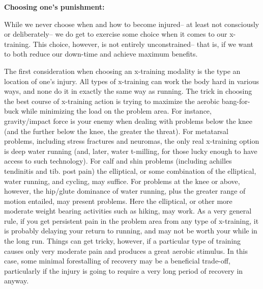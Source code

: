 \bigskip

\textbf{Choosing one's punishment:}

\bigskip

While we never choose when and how to become injured-- at least not consciously or deliberately-- we do get to exercise some choice when it comes to our x-training. This choice, however, is not entirely unconstrained-- that is, if we want to both reduce our down-time and achieve maximum benefits.

The first consideration when choosing an x-training modality is the type an location of one's injury. All types of x-training can work the body hard in various ways, and none do it in exactly the same way as running. The trick in choosing the best course of x-training action is trying to maximize the aerobic bang-for-buck while minimizing the load on the problem area. For instance, gravity/impact force is your enemy when dealing with problems below the knee (and the further below the knee, the greater the threat). For metatarsal problems, including stress fractures and neuromas, the only real x-training option is deep water running (and, later, water t-milling, for those lucky enough to have access to such technology). For calf and shin problems (including achilles tendinitis and tib. post pain) the elliptical, or some combination of the elliptical, water running, and cycling, may suffice. For problems at the knee or above, however, the hip/glute dominance of water running, plus the greater range of motion entailed, may present problems. Here the elliptical, or other more moderate weight bearing activities such as hiking, may work. As a very general rule, if you get persistent pain in the problem area from any type of x-training, it is probably delaying your return to running, and may not be worth your while in the long run. Things can get tricky, however, if a particular type of training causes only very moderate pain and produces a great aerobic stimulus. In this case, some minimal forestalling of recovery may be a beneficial trade-off, particularly if the injury is going to require a very long period of recovery in anyway.

